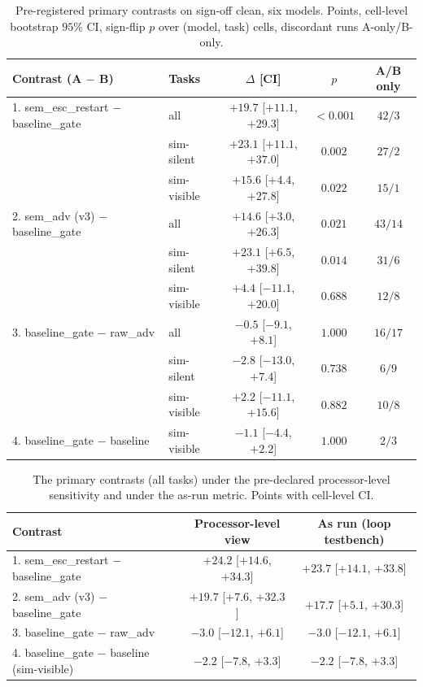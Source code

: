 \documentclass[11pt]{article}
\begin{document}
\begin{table}[htbp]
\centering
\caption{Pre-registered primary contrasts on sign-off clean, six models.
Points, cell-level bootstrap $95\%$ CI, sign-flip $p$ over (model, task)
cells, discordant runs A-only/B-only.}
\label{tab:primary}
\small
\begin{tabular}{@{}l l c c c@{}}
\toprule
\textbf{Contrast (A $-$ B)} & \textbf{Tasks} & \textbf{$\Delta$ [CI]} & \textbf{$p$} & \textbf{A/B only} \\
\midrule
1. sem\_esc\_restart $-$ baseline\_gate & all         & $\mathbf{+19.7}$ [$+11.1$, $+29.3$] & ${<}0.001$ & $42/3$ \\
                                        & sim-silent  & $+23.1$ [$+11.1$, $+37.0$] & $0.002$ & $27/2$ \\
                                        & sim-visible & $+15.6$ [$+4.4$, $+27.8$]  & $0.022$ & $15/1$ \\
2. sem\_adv (v3) $-$ baseline\_gate     & all         & $\mathbf{+14.6}$ [$+3.0$, $+26.3$] & $0.021$ & $43/14$ \\
                                        & sim-silent  & $+23.1$ [$+6.5$, $+39.8$]  & $0.014$ & $31/6$ \\
                                        & sim-visible & $+4.4$ [$-11.1$, $+20.0$]  & $0.688$ & $12/8$ \\
3. baseline\_gate $-$ raw\_adv          & all         & $-0.5$ [$-9.1$, $+8.1$]    & $1.000$ & $16/17$ \\
                                        & sim-silent  & $-2.8$ [$-13.0$, $+7.4$]   & $0.738$ & $6/9$ \\
                                        & sim-visible & $+2.2$ [$-11.1$, $+15.6$]  & $0.882$ & $10/8$ \\
4. baseline\_gate $-$ baseline          & sim-visible & $-1.1$ [$-4.4$, $+2.2$]    & $1.000$ & $2/3$ \\
\bottomrule
\end{tabular}
\end{table}

\begin{table}[htbp]
\centering
\caption{The primary contrasts (all tasks) under the pre-declared
processor-level sensitivity and under the as-run metric. Points with
cell-level CI.}
\label{tab:sens}
\small
\begin{tabular}{@{}l c c@{}}
\toprule
\textbf{Contrast} & \textbf{Processor-level view} & \textbf{As run (loop testbench)} \\
\midrule
1. sem\_esc\_restart $-$ baseline\_gate & $+24.2$ [$+14.6$, $+34.3$] & $+23.7$ [$+14.1$, $+33.8$] \\
2. sem\_adv (v3) $-$ baseline\_gate     & $+19.7$ [$+7.6$, $+32.3$]  & $+17.7$ [$+5.1$, $+30.3$] \\
3. baseline\_gate $-$ raw\_adv          & $-3.0$ [$-12.1$, $+6.1$]   & $-3.0$ [$-12.1$, $+6.1$] \\
4. baseline\_gate $-$ baseline (sim-visible) & $-2.2$ [$-7.8$, $+3.3$] & $-2.2$ [$-7.8$, $+3.3$] \\
\bottomrule
\end{tabular}
\end{table}
\end{document}
